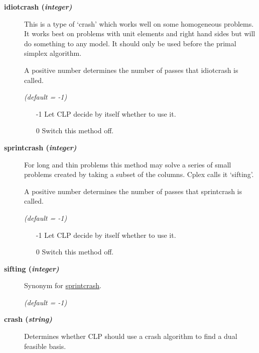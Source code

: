 \begin{description}

\item[\label{idiotcrash}\hypertarget{idiotcrash}
{\textbf{idiotcrash (\slshape{integer})}}]\hspace{1.0in}

This is a type of `crash' which works well on some homogeneous problems.
It works best on problems with unit elements and right hand sides but will do something to any model.
It should only be used before the primal simplex algorithm.

A positive number determines the number of passes that idiotcrash is called.

\textsl{(default = -1)}
\begin{itemize}
\item[-1] 
Let CLP decide by itself whether to use it.
\item[0] 
Switch this method off.
\end{itemize}

\item[\label{sprintcrash}\hypertarget{sprintcrash}
{\textbf{sprintcrash (\slshape{integer})}}]\hspace{1.0in}

For long and thin problems this method may solve a series of small problems created by taking a subset of the columns.
Cplex calls it `sifting'.

A positive number determines the number of passes that sprintcrash is called.

\textsl{(default = -1)}
\begin{itemize}
\item[-1] 
Let CLP decide by itself whether to use it.
\item[0] 
Switch this method off.
\end{itemize}

\item[\label{sifting}\hypertarget{sifting}
{\textbf{sifting (\slshape{integer})}}]\hspace{1.0in}

Synonym for \hyperlink{sprintcrash}{sprintcrash}.

\textsl{(default = -1)}

\item[\label{crash}\hypertarget{crash}
{\textbf{crash (\slshape{string})}}]\hspace{1.0in}

Determines whether CLP should use a crash algorithm to find a dual feasible basis.


\end{description}

